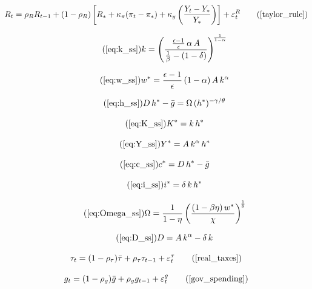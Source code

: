 \documentclass[11pt,preprint]{elsarticle}
\numberwithin{equation}{section}
\numberwithin{figure}{section}
\numberwithin{table}{section}
\begin{document}
\begin{equation}
R_t = \rho_R R_{t-1} + (1 - \rho_R) \left[ R_* + \kappa_\pi (\pi_t - \pi_*) + \kappa_y \left( \frac{Y_t - Y_*}{Y_*} \right) \right] + \varepsilon_t^R
\tag{\ref{taylor_rule}}
\end{equation}

\begin{equation}\tag{\ref{eq:k_ss}}
k = \left(\frac{\tfrac{\epsilon-1}{\epsilon}\,\alpha\,A}{\tfrac{1}{\beta} - (1-\delta)}\right)^{\!\frac{1}{1-\alpha}}
\end{equation}

\begin{equation}\tag{\ref{eq:w_ss}}
w^* = \frac{\epsilon-1}{\epsilon}\,(1-\alpha)\,A\,k^\alpha
\end{equation}

\begin{equation}\tag{\ref{eq:h_ss}}
D\,h^* - \bar{g} = \Omega\,(h^*)^{-\gamma/\theta}
\end{equation}

\begin{equation}\tag{\ref{eq:K_ss}}
K^* = k\,h^*
\end{equation}

\begin{equation}\tag{\ref{eq:Y_ss}}
Y^* = A\,k^\alpha\,h^*
\end{equation}

\begin{equation}\tag{\ref{eq:c_ss}}
c^* = D\,h^* - \bar{g}
\end{equation}

\begin{equation}\tag{\ref{eq:i_ss}}
i^* = \delta\,k\,h^*
\end{equation}

\begin{equation}\tag{\ref{eq:Omega_ss}}
\Omega = \frac{1}{1-\eta}
         \left(\frac{(1-\beta\eta)\,w^*}{\chi}\right)^{\!\frac{1}{\theta}}
\end{equation}

\begin{equation}\tag{\ref{eq:D_ss}}
D = A\,k^\alpha - \delta\,k
\end{equation}

\begin{equation}
\tau_t = (1-\rho_\tau)\bar{\tau} + \rho_\tau \tau_{t-1} + \varepsilon_t^\tau 
\tag{\ref{real_taxes}}
\end{equation}

\begin{equation}
g_t = (1-\rho_g)\bar{g} + \rho_g g_{t-1} + \varepsilon_t^g 
\tag{\ref{gov_spending}}
\end{equation}
\end{document}
